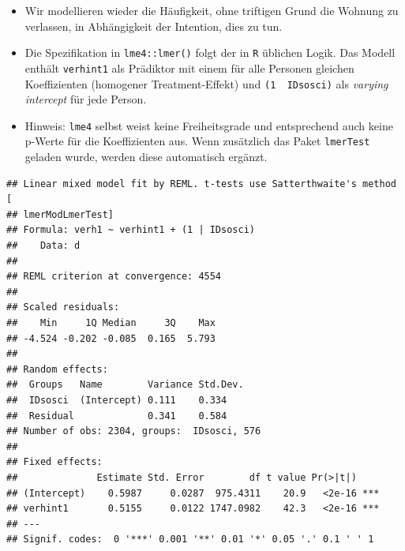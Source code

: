 \documentclass[
]{book}
\newenvironment{Shaded}{\begin{snugshade}}{\end{snugshade}}
\newcommand{\DataTypeTok}[1]{\textcolor[rgb]{0.13,0.29,0.53}{#1}}
\newcommand{\DecValTok}[1]{\textcolor[rgb]{0.00,0.00,0.81}{#1}}
\newcommand{\KeywordTok}[1]{\textcolor[rgb]{0.13,0.29,0.53}{\textbf{#1}}}
\newcommand{\NormalTok}[1]{#1}
\newcommand{\OperatorTok}[1]{\textcolor[rgb]{0.81,0.36,0.00}{\textbf{#1}}}
\newcommand{\OtherTok}[1]{\textcolor[rgb]{0.56,0.35,0.01}{#1}}
\newcommand{\StringTok}[1]{\textcolor[rgb]{0.31,0.60,0.02}{#1}}
\begin{document}
\begin{itemize}
\item
  Wir modellieren wieder die Häufigkeit, ohne triftigen Grund die Wohnung zu verlassen, in Abhängigkeit der Intention, dies zu tun.
\item
  Die Spezifikation in \texttt{lme4::lmer()} folgt der in \texttt{R} üblichen Logik. Das Modell enthält \texttt{verhint1} als Prädiktor mit einem für alle Personen gleichen Koeffizienten (homogener Treatment-Effekt) und \texttt{(1\ \textbar{}~IDsosci)} als \emph{varying intercept} für jede Person.
\item
  Hinweis: \texttt{lme4} selbst weist keine Freiheitsgrade und entsprechend auch keine p-Werte für die Koeffizienten aus. Wenn zusätzlich das Paket \texttt{lmerTest} geladen wurde, werden diese automatisch ergänzt.
\end{itemize}

\begin{Shaded}
\end{Shaded}

\begin{verbatim}
## Linear mixed model fit by REML. t-tests use Satterthwaite's method [
## lmerModLmerTest]
## Formula: verh1 ~ verhint1 + (1 | IDsosci)
##    Data: d
## 
## REML criterion at convergence: 4554
## 
## Scaled residuals: 
##    Min     1Q Median     3Q    Max 
## -4.524 -0.202 -0.085  0.165  5.793 
## 
## Random effects:
##  Groups   Name        Variance Std.Dev.
##  IDsosci  (Intercept) 0.111    0.334   
##  Residual             0.341    0.584   
## Number of obs: 2304, groups:  IDsosci, 576
## 
## Fixed effects:
##              Estimate Std. Error        df t value Pr(>|t|)    
## (Intercept)    0.5987     0.0287  975.4311    20.9   <2e-16 ***
## verhint1       0.5155     0.0122 1747.0982    42.3   <2e-16 ***
## ---
## Signif. codes:  0 '***' 0.001 '**' 0.01 '*' 0.05 '.' 0.1 ' ' 1
\end{verbatim}
\end{document}
